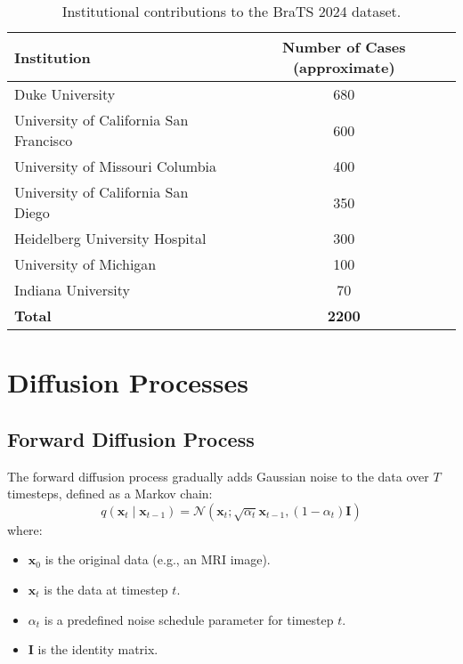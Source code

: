 \documentclass[11pt]{article}
\begin{document}
\begin{table}[h!]
\centering
\begin{tabular}{|l|c|}
\hline
\textbf{Institution}                      & \textbf{Number of Cases (approximate)} \\ \hline
Duke University                           & 680                                    \\ \hline
University of California San Francisco    & 600                                    \\ \hline
University of Missouri Columbia           & 400                                    \\ \hline
University of California San Diego        & 350                                    \\ \hline
Heidelberg University Hospital            & 300                                    \\ \hline
University of Michigan                    & 100                                    \\ \hline
Indiana University                        & 70                                     \\ \hline
\textbf{Total}                            & \textbf{2200}                          \\ \hline
\end{tabular}
\caption{Institutional contributions to the BraTS 2024 dataset.}
\label{tab:brats2024_contributions}
\end{table}

\section{Diffusion Processes}

\subsection{Forward Diffusion Process}
The forward diffusion process gradually adds Gaussian noise to the data over \( T \) timesteps, defined as a Markov chain:
\begin{equation}
    q(\mathbf{x}_t \mid \mathbf{x}_{t-1}) = \mathcal{N} \left( \mathbf{x}_t; \sqrt{\alpha_t} \mathbf{x}_{t-1}, (1 - \alpha_t) \mathbf{I} \right)
    \label{eq:forward_step}
\end{equation}
where:
\begin{itemize}[leftmargin=*]
    \item \( \mathbf{x}_0 \) is the original data (e.g., an MRI image).
    \item \( \mathbf{x}_t \) is the data at timestep \( t \).
    \item \( \alpha_t \) is a predefined noise schedule parameter for timestep \( t \).
    \item \( \mathbf{I} \) is the identity matrix.
\end{itemize}
\end{document}
